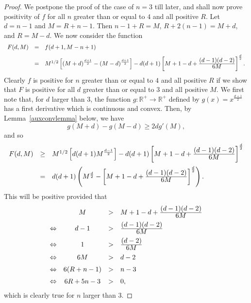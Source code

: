 \documentclass[11pt,a4paper,times]{amsart}
\theoremstyle{plain}
\theoremstyle{definition}
\numberwithin{equation}{section}
\newcommand{\ds}{\displaystyle}
\newcommand{\eqskip}{ \vspace*{2mm}\\ }
\newcommand{\R}{\mathbb{R}}
\newcommand{\fr}[2]{\frac{\ds #1}{\ds #2}}
\begin{document}
{\begin{proof}
 We postpone the proof of the case of $n=3$ till later, and shall now prove positivity of $f$ for all $n$ greater than
 or equal to $4$ and all positive $R$.
 Let $d=n-1$ and $M=R+n-1$. Then $n-1+R = M$, $R+2(n-1) = M+d$, and $R=M-d$. We now consider the function
 \[
 \begin{array}{lll}
  F(d,M) & = & f(d+1,M-n+1)\eqskip
  & = & M^{1/2} \left[ (M+d)^{\frac{d+1}{2}} - (M-d)^{\frac{d+1}{2}} \right]
  - d(d+1)\left[ M+1-d +\fr{(d-1)(d-2)}{6M} \right]^{\frac{d}{2}}.
 \end{array}
 \]
 Clearly $f$ is positive for $n$ greater than or equal to $4$ and all positive $R$ if we show
 that $F$ is positive for all $d$ greater than or equal to $3$ and all positive $M$. We first note
 that, for $d$ larger than $3$, the function $g:\R^{+}\to \R^{+}$ defined by $g(x) = x^{\frac{d+1}{2}}$ has
 a first derivative which is continuous and convex. Then, by Lemma~\ref{auxconvlemma} below,
 we have
 \[
  g(M+d)-g(M-d) \geq 2d g'(M),
 \]
 and so
 \begin{equation}
 \begin{array}{lll}
  F(d,M) & \geq & M^{1/2} \left[d(d+1) M^{\frac{d-1}{2}}\right]-d(d+1) \left[ M+1-d + \fr{(d-1)(d-2)}{6M}\right]^{\frac{d}{2}}\eqskip
  & = & d(d+1) \left( M^{\frac{d}{2}} - \left[M+1-d + \fr{(d-1)(d-2)}{6M}\right]^{\frac{d}{2}}\right).\label{flowb}
 \end{array}
 \end{equation}
 This will be positive provided that
 \[
  \begin{array}{lcll}
   & M & > & M+1-d + \fr{(d-1)(d-2)}{6M} \eqskip
   \Leftrightarrow & d-1 & > & \fr{(d-1)(d-2)}{6M} \eqskip
   \Leftrightarrow & 1 & > & \fr{(d-2)}{6M} \eqskip
   \Leftrightarrow & 6M & > & d-2 \eqskip
   \Leftrightarrow & 6(R+n-1) & > & n-3 \eqskip
   \Leftrightarrow & 6R + 5 n - 3 & > &0,
  \end{array}
 \]
 which is clearly true for $n$ larger than $3$.


\end{proof}}
\end{document}
